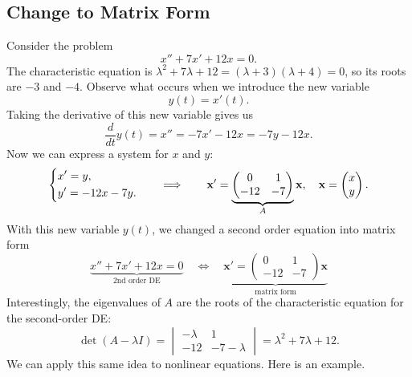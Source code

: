 \documentclass[10pt,letterpaper]{article}
\begin{document}
\subsection{Change to Matrix Form}
Consider the problem
\[
x''+7x'+12x=0.
\]
The characteristic equation is $\lambda^2+7\lambda+12=(\lambda+3)(\lambda+4)=0$, so its roots are $-3$ and $-4$. Observe what occurs when we introduce the new variable $$y(t)=x'(t).$$ 
Taking the derivative of this new variable gives us 
$$\frac{d}{dt}y(t)=x''=-7x'-12x=-7y-12x.$$
Now we can express a system for $x$ and $y$: 
\[
\begin{dcases}
x'=y,\\
y'=-12x-7y.
\end{dcases}
\qquad\Longrightarrow\qquad
\mathbf{x}'=
\underbrace{\begin{pmatrix}0&1\\-12&-7\end{pmatrix}}_{A}\mathbf{x},
\quad \mathbf{x}=\begin{pmatrix}x\\y\end{pmatrix}.
\]
With this new variable $y(t)$, we changed a second order equation into matrix form
$$
\underbrace{x''+7x'+12x=0}_{\text{2nd order DE}} \quad \Leftrightarrow \quad 
\underbrace{\textbf{x}' = \begin{pmatrix}
    0 & 1\\
    -12 & -7
\end{pmatrix}\textbf{x}}_{\text{matrix form}}
$$
Interestingly, the eigenvalues of $A$ are the roots of the characteristic equation for the second-order DE:
\[
\det(A-\lambda I)=
\begin{vmatrix}-\lambda&1\\-12&-7-\lambda \end{vmatrix}
=\lambda^2+7\lambda+12.
\]
We can apply this same idea to nonlinear equations. Here is an example.


\end{document}

